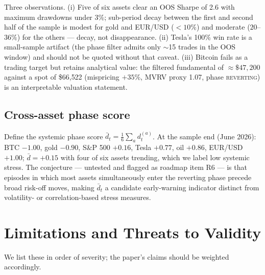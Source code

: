 \documentclass[11pt,a4paper]{article}
\begin{document}
Three observations. (i) Five of six assets clear an OOS Sharpe of 2.6 with maximum drawdowns under 3\%; sub-period decay between the first and second half of the sample is modest for gold and EUR/USD ($<10\%$) and moderate ($20$--$36\%$) for the others --- decay, not disappearance. (ii) Tesla's 100\% win rate is a small-sample artifact (the phase filter admits only $\sim$15 trades in the OOS window) and should not be quoted without that caveat. (iii) Bitcoin fails as a trading target but retains analytical value: the filtered fundamental of $\approx\$47{,}200$ against a spot of \$66{,}522 (mispricing $+35\%$, MVRV proxy 1.07, phase \textsc{reverting}) is an interpretable valuation statement.

\subsection{Cross-asset phase score}

Define the systemic phase score $\bar{d}_t = \tfrac{1}{6}\sum_{a} d^{(a)}_t$. At the sample end (June 2026): BTC $-1.00$, gold $-0.90$, S\&P 500 $+0.16$, Tesla $+0.77$, oil $+0.86$, EUR/USD $+1.00$; $\bar{d} = +0.15$ with four of six assets trending, which we label low systemic stress. The conjecture --- untested and flagged as roadmap item R6 --- is that episodes in which most assets simultaneously enter the reverting phase precede broad risk-off moves, making $\bar{d}_t$ a candidate early-warning indicator distinct from volatility- or correlation-based stress measures.

\section{Limitations and Threats to Validity}\label{sec:limits}

We list these in order of severity; the paper's claims should be weighted accordingly.
\end{document}
